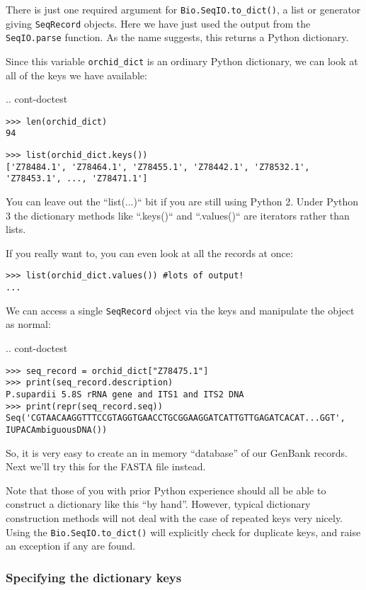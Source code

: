 There is just one required argument for \verb|Bio.SeqIO.to_dict()|, a list or
generator giving \verb|SeqRecord| objects. Here we have just used the output
from the \verb|SeqIO.parse| function. As the name suggests, this returns a
Python dictionary.

Since this variable \verb|orchid_dict| is an ordinary Python dictionary,
we can look at all of the keys we have available:

\pandocignoreme .. cont-doctest
\begin{verbatim}
>>> len(orchid_dict)
94
\end{verbatim}
\begin{verbatim}
>>> list(orchid_dict.keys())
['Z78484.1', 'Z78464.1', 'Z78455.1', 'Z78442.1', 'Z78532.1', 'Z78453.1', ..., 'Z78471.1']
\end{verbatim}

You can leave out the ``list(...)`` bit if you are still using Python 2.
Under Python 3 the dictionary methods like ``.keys()`` and ``.values()``
are iterators rather than lists.

If you really want to, you can even look at all the records at once:
\begin{verbatim}
>>> list(orchid_dict.values()) #lots of output!
...
\end{verbatim}

We can access a single \verb|SeqRecord| object via the keys and manipulate the object as normal:

\pandocignoreme .. cont-doctest
\begin{verbatim}
>>> seq_record = orchid_dict["Z78475.1"]
>>> print(seq_record.description)
P.supardii 5.8S rRNA gene and ITS1 and ITS2 DNA
>>> print(repr(seq_record.seq))
Seq('CGTAACAAGGTTTCCGTAGGTGAACCTGCGGAAGGATCATTGTTGAGATCACAT...GGT', IUPACAmbiguousDNA())
\end{verbatim}

So, it is very easy to create an in memory ``database'' of our GenBank records.  Next we'll try this for the FASTA file instead.

Note that those of you with prior Python experience should all be able to construct a dictionary like this ``by hand''.  However, typical dictionary construction methods will not deal with the case of repeated keys very nicely.  Using the \verb|Bio.SeqIO.to_dict()| will explicitly check for duplicate keys, and raise an exception if any are found.

\subsubsection{Specifying the dictionary keys}
\label{sec:seqio-todict-functionkey}

